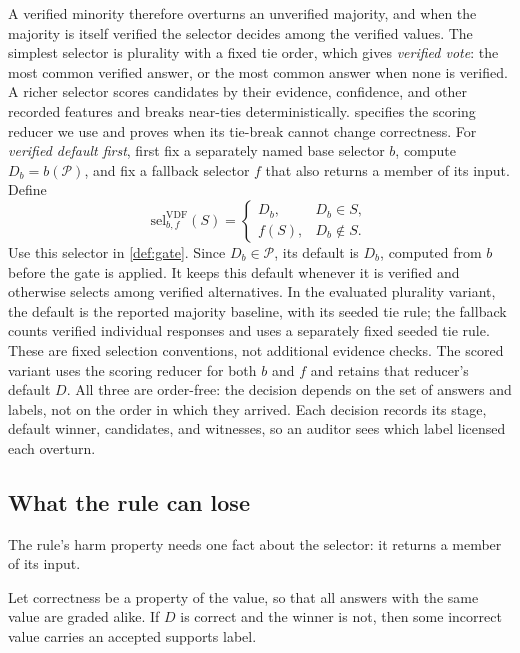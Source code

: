 A verified minority therefore overturns an unverified majority, and when the majority is itself verified the selector decides among the verified values. The simplest selector is plurality with a fixed tie order, which gives \emph{verified vote}: the most common verified answer, or the most common answer when none is verified. A richer selector scores candidates by their evidence, confidence, and other recorded features and breaks near-ties deterministically.  specifies the scoring reducer we use and proves when its tie-break cannot change correctness. For \emph{verified default first}, first fix a separately named base selector $b$, compute $D_b=b(\mathcal{P})$, and fix a fallback selector $f$ that also returns a member of its input. Define
\[
  \mathrm{sel}^{\mathrm{VDF}}_{b,f}(S)=
  \begin{cases}
    D_b, & D_b\in S,\\
    f(S), & D_b\notin S.
  \end{cases}
\]
Use this selector in \cref{def:gate}. Since $D_b\in\mathcal{P}$, its default is $D_b$, computed from $b$ before the gate is applied. It keeps this default whenever it is verified and otherwise selects among verified alternatives. In the evaluated plurality variant, the default is the reported majority baseline, with its seeded tie rule; the fallback counts verified individual responses and uses a separately fixed seeded tie rule. These are fixed selection conventions, not additional evidence checks. The scored variant uses the scoring reducer for both $b$ and $f$ and retains that reducer's default $D$. All three are order-free: the decision depends on the set of answers and labels, not on the order in which they arrived. Each decision records its stage, default winner, candidates, and witnesses, so an auditor sees which label licensed each overturn.

\subsection{What the rule can lose}

The rule's harm property needs one fact about the selector: it returns a member of its input.

\begin{proposition}
\label{prop:gate-harm}
Let correctness be a property of the value, so that all answers with the same value are graded alike. If $D$ is correct and the winner is not, then some incorrect value carries an accepted supports label.
\end{proposition}

